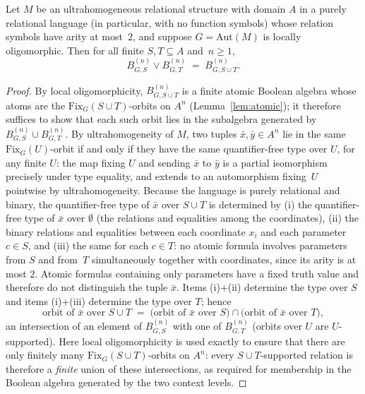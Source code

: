 \documentclass{lmcs}
\newcommand{\Fix}{\mathrm{Fix}}
\newcommand{\Aut}{\mathrm{Aut}}
\begin{document}
\begin{thm}
\label{thm:join}
Let $M$ be an ultrahomogeneous relational structure with domain $A$ in a
purely relational language (in particular, with no function symbols) whose
relation symbols have arity at most~$2$, and suppose $G=\Aut(M)$ is locally
oligomorphic. Then for all finite
$S,T\subseteq A$ and~$n\geq1$,
\[
B^{(n)}_{G,S}\vee B^{(n)}_{G,T}\;=\;B^{(n)}_{G,S\cup T}.
\]
\end{thm}
\begin{proof}
By local oligomorphicity, $B^{(n)}_{G,S\cup T}$ is a finite atomic
Boolean algebra whose atoms are the $\Fix_G(S\cup T)$-orbits on $A^n$
(Lemma~\ref{lem:atomic}); it therefore suffices to show that each such
orbit lies in the subalgebra generated by $B^{(n)}_{G,S}\cup
B^{(n)}_{G,T}$. By ultrahomogeneity of $M$, two tuples
$\bar x,\bar y\in A^n$ lie in the same $\Fix_G(U)$-orbit if and only
if they have the same quantifier-free type over $U$, for any finite
$U$: the map fixing $U$ and sending $\bar x$ to $\bar y$ is a partial
isomorphism precisely under type equality, and extends to an
automorphism fixing~$U$ pointwise by ultrahomogeneity. Because the
language is purely relational and binary, the quantifier-free type of
$\bar x$ over $S\cup T$ is
determined by (i) the quantifier-free type of $\bar x$ over
$\emptyset$ (the relations and equalities among the coordinates),
(ii) the binary relations and equalities between each coordinate
$x_i$ and each parameter $c\in S$, and (iii) the same for each $c\in
T$: no atomic formula involves parameters from $S$ and from~$T$
simultaneously together with coordinates, since its arity is at most
$2$. Atomic formulas containing only parameters have a fixed truth
value and therefore do not distinguish the tuple $\bar x$. Items
(i)+(ii) determine the type over $S$ and items (i)+(iii) determine the
type over $T$; hence
\[
\text{orbit of }\bar x\text{ over }S\cup T
\;=\;
\bigl(\text{orbit of }\bar x\text{ over }S\bigr)\cap
\bigl(\text{orbit of }\bar x\text{ over }T\bigr),
\]
an intersection of an element of $B^{(n)}_{G,S}$ with one of
$B^{(n)}_{G,T}$ (orbits over $U$ are $U$-supported). Here local
oligomorphicity is used exactly to ensure that there are only finitely
many $\Fix_G(S\cup T)$-orbits on $A^n$: every
$S\cup T$-supported relation is therefore a \emph{finite} union of
these intersections, as required for membership in the Boolean algebra
generated by the two context levels.
\end{proof}
\end{document}
